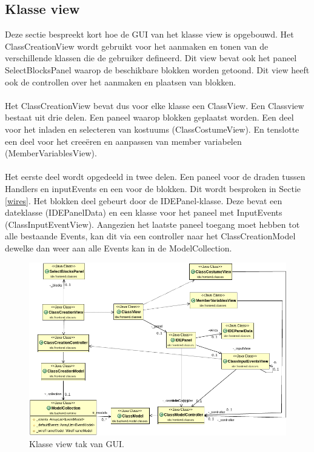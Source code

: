 \documentclass[]{article}
\begin{document}
\subsection{Klasse view}
Deze sectie bespreekt kort hoe de GUI van het klasse view is opgebouwd. Het ClassCreationView wordt gebruikt voor het aanmaken en tonen van de verschillende klassen die de gebruiker defineerd. Dit view bevat ook het paneel SelectBlocksPanel waarop de beschikbare blokken worden getoond. Dit view heeft ook de controllen over het aanmaken en plaatsen van blokken.\\\\
Het ClassCreationView bevat dus voor elke klasse een ClassView. Een Classview bestaat uit drie delen. Een paneel waarop blokken geplaatst worden. Een deel voor het inladen en selecteren van kostuums (ClassCostumeView). En tenslotte een deel voor het cree\"{e}ren en aanpassen van member variabelen (MemberVariablesView).\\\\
Het eerste deel wordt opgedeeld in twee delen. Een paneel voor de draden tussen Handlers en inputEvents en een voor de blokken. Dit wordt besproken in Sectie \ref{wires}.  Het blokken deel gebeurt door de IDEPanel-klasse. Deze bevat een dateklasse (IDEPanelData) en een klasse voor het paneel met InputEvents (ClassInputEventView). Aangezien het laatste paneel toegang moet hebben tot alle bestaande Events, kan dit via een controller naar het ClassCreationModel dewelke dan weer aan alle Events kan in de ModelCollection.
\begin{figure}[H]
  \centering 
\includegraphics[scale=0.4]{AnalyseADTAlgorithm/viewsmvc/classtak}
  \caption{Klasse view tak van GUI.} \label{ClassViews}
\end{figure}
\end{document}

